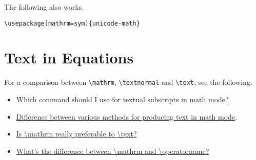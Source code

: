 \documentclass{article}
\begin{document}
The following also works.
\begin{verbatim}
\usepackage[mathrm=sym]{unicode-math}
\end{verbatim}

\section{Text in Equations}

For a comparison between \texttt{\textbackslash mathrm}, \texttt{\textbackslash textnormal} and \texttt{\textbackslash text}, see the following.
\begin{itemize}
    \item \href{https://tex.stackexchange.com/questions/98406/which-command-should-i-use-for-textual-subscripts-in-math-mode}{Which command should I use for textual subscripts in math mode?}
    \item \href{https://tex.stackexchange.com/questions/70632/difference-between-various-methods-for-producing-text-in-math-mode}{Difference between various methods for producing text in math mode}.
    \item \href{https://tex.stackexchange.com/questions/98008/is-mathrm-really-preferable-to-text}{Is \textbackslash mathrm really preferable to \textbackslash text?}
    \item \href{https://tex.stackexchange.com/questions/48459/whats-the-difference-between-mathrm-and-operatorname}{What's the difference between \textbackslash mathrm and \textbackslash operatorname?}
\end{itemize}
\end{document}
